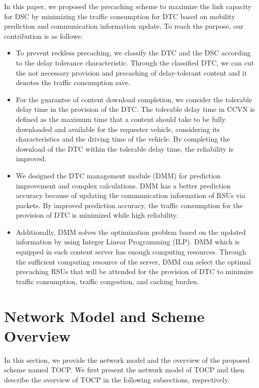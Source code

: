 \documentclass{ieeeaccess}
\begin{document}
In this paper, we proposed the precaching scheme to maximize the link capacity for DSC by minimizing the traffic consumption for DTC based on mobility prediction and communication information update.
To reach the purpose, our contribution is as follows:
\begin{itemize}
\item To prevent reckless precaching, we classify the DTC and the DSC according to the delay tolerance characteristic.
Through the classified DTC, we can cut the not necessary provision and precaching of delay-tolerant content and it denotes the traffic consumption save.
\item For the guarantee of content download completion, we consider the tolerable delay time in the provision of the DTC.
The tolerable delay time in CCVN is defined as the maximum time that a content should take to be fully downloaded and available for the requester vehicle, considering its characteristics and the driving time of the vehicle.
By completing the download of the DTC within the tolerable delay time, the reliability is improved.
\item We designed the DTC management module (DMM) for prediction improvement and complex calculations.
DMM has a better prediction accuracy because of updating the communication information of RSUs via packets.
By improved prediction accuracy, the traffic consumption for the provision of DTC is minimized while high reliability.
\item Additionally, DMM solves the optimization problem based on the updated information by using Integer Linear Programming (ILP).
DMM which is equipped in each content server has enough computing resources.
Through the sufficient computing resource of the server, DMM can select the optimal precaching RSUs that will be attended for the provision of DTC to minimize traffic consumption, traffic congestion, and caching burden.
\end{itemize}

\section{Network Model and Scheme Overview} \label{sec.net}
In this section, we provide the network model and the overview of the proposed scheme named TOCP. 
We first present the network model of TOCP and then describe the overview of TOCP in the following subsections, respectively.
\end{document}

